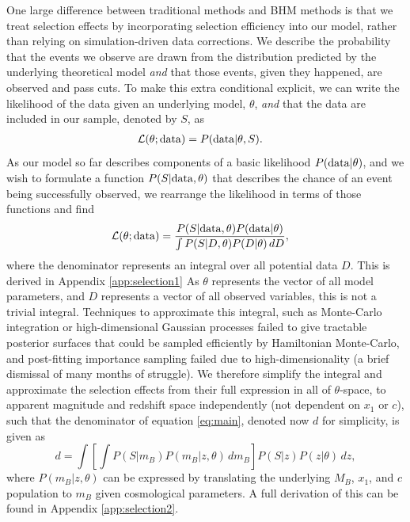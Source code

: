 \documentclass[a4paper,fleqn,usenatbib,manuscript]{emulateapj}
\begin{document}
One large difference between traditional methods and BHM methods is that we treat selection effects by incorporating selection efficiency into our model, rather than relying on simulation-driven data corrections. We describe the probability that the events we observe are drawn from the distribution predicted by the underlying theoretical model \textit{and} that those events, given they happened, are observed and pass cuts.  To make this extra conditional explicit, we can write the likelihood of the data given an underlying model, $\theta$, \textit{and} that the data are included in our sample, denoted by $S$, as
\begin{align}
\mathcal{L}(\theta; {\rm data}) &= P({\rm data} | \theta, S). \label{eq:like}
\end{align}
As our model so far describes components of a basic likelihood $P({\rm data}|\theta)$, and we wish to formulate a function $P(S|{\rm data},\theta)$ that describes the chance of an event being successfully observed, we rearrange the likelihood in terms of those functions and find
\begin{align}
\mathcal{L}(\theta; {\rm data}) &= \frac{P(S|{\rm data},\theta) P({\rm data}|\theta)}{\int P(S | D, \theta) P(D|\theta)\, dD}, \label{eq:main}
\end{align}
where the denominator represents an integral over all potential data $D$. This is derived in Appendix \ref{app:selection1} As $\theta$ represents the vector of all model parameters, and $D$ represents a vector of all observed variables, this is not a trivial integral. Techniques to approximate this integral, such as Monte-Carlo integration or high-dimensional Gaussian processes failed to give tractable posterior surfaces that could be sampled efficiently by Hamiltonian Monte-Carlo, and post-fitting importance sampling failed due to high-dimensionality (a brief dismissal of many months of struggle). We therefore simplify the integral and approximate the selection effects from their full expression in all of $\theta$-space, to apparent magnitude and redshift space independently (not dependent on $x_1$ or $c$), such that the denominator of equation \eqref{eq:main}, denoted now $d$ for simplicity, is given as
\begin{equation}
d = \int  \left[ \int P(S|m_B) P(m_B | z, \theta)\, d m_B \right] P(S|z) P(z|\theta)\, dz, \label{eq:w1}
\end{equation}
where $P(m_B | z, \theta)$ can be expressed by translating the underlying $M_B$, $x_1$, and $c$ population to $m_B$ given cosmological parameters. A full derivation of this can be found in Appendix \ref{app:selection2}.
\end{document}
